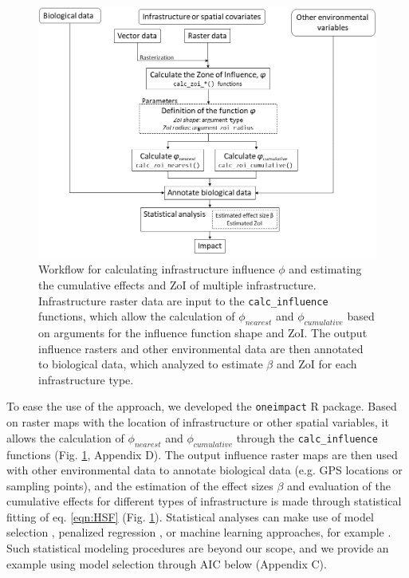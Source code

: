 \documentclass[titlepage]{article}
\begin{document}
\begin{figure}[h]
\centering
\includegraphics[width=1.3\textwidth,center]{figures/figure_workflow.png}
\caption{\label{fig:workflow} Workflow for calculating infrastructure influence $\phi$ and estimating the cumulative effects and ZoI of multiple infrastructure. Infrastructure raster data are input to the \texttt{calc\_influence} functions, which allow the calculation 
of $\phi_{nearest}$ and $\phi_{cumulative}$ based on arguments for the influence function shape and ZoI. The output influence rasters and other environmental data are then annotated to biological data, which analyzed to estimate $\beta$ and ZoI for each infrastructure type.}
\end{figure}

To ease the use of the approach, we developed the \verb|oneimpact| R package. Based on raster maps with the location of infrastructure or other spatial variables, it allows the calculation of $\phi_{nearest}$ and $\phi_{cumulative}$ through the \verb|calc_influence| functions (Fig. \ref{fig:workflow}, Appendix D). The output influence raster maps are then used with other environmental data to annotate biological data (e.g. GPS locations or sampling points), and the estimation of the effect sizes $\beta$ and evaluation of the cumulative effects for different types of infrastructure is made through statistical fitting of eq. \ref{eqn:HSF} (Fig. \ref{fig:workflow}). Statistical analyses can make use of model selection \citep{burnham_model_2002}, penalized regression \citep{lee_estimating_2020}, or machine learning approaches, for example \citep[Appendix D]{james_introduction_2021}. Such statistical modeling procedures are beyond our scope, and we provide an example using model selection through AIC below (Appendix C). 
\end{document}
